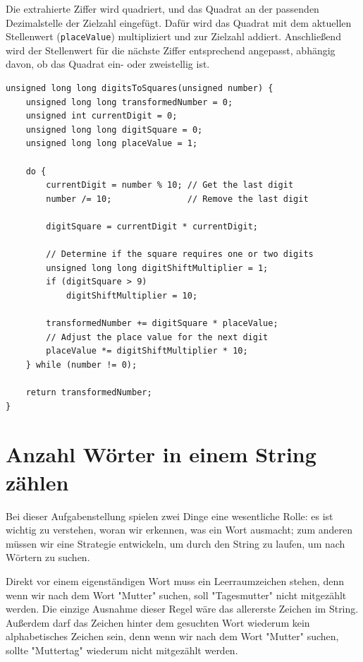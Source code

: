 Die extrahierte Ziffer wird quadriert, und das Quadrat an der passenden
Dezimalstelle der Zielzahl eingefügt. Dafür wird das Quadrat mit dem aktuellen
Stellenwert (\texttt{placeValue}) multipliziert und zur Zielzahl addiert.
Anschließend wird der Stellenwert für die nächste Ziffer entsprechend angepasst,
abhängig davon, ob das Quadrat ein- oder zweistellig ist.

\begin{verbatim}
unsigned long long digitsToSquares(unsigned number) {
    unsigned long long transformedNumber = 0;
    unsigned int currentDigit = 0;
    unsigned long long digitSquare = 0;
    unsigned long long placeValue = 1;

    do {
        currentDigit = number % 10; // Get the last digit
        number /= 10;               // Remove the last digit

        digitSquare = currentDigit * currentDigit;

        // Determine if the square requires one or two digits
        unsigned long long digitShiftMultiplier = 1;
        if (digitSquare > 9)
            digitShiftMultiplier = 10;

        transformedNumber += digitSquare * placeValue;
        // Adjust the place value for the next digit
        placeValue *= digitShiftMultiplier * 10;
    } while (number != 0);

    return transformedNumber;
}
\end{verbatim}




\chapter{Anzahl Wörter in einem String zählen}

Bei dieser Aufgabenstellung spielen zwei Dinge eine wesentliche Rolle: es ist
wichtig zu verstehen, woran wir erkennen, was ein Wort ausmacht; zum anderen
müssen wir eine Strategie entwickeln, um durch den String zu laufen, um nach
Wörtern zu suchen.

Direkt vor einem eigenständigen Wort muss ein Leerraumzeichen stehen, denn wenn
wir nach dem Wort "Mutter" suchen, soll "Tagesmutter" nicht mitgezählt werden.
Die einzige Ausnahme dieser Regel wäre das allererste Zeichen im String.
Außerdem darf das Zeichen hinter dem gesuchten Wort wiederum kein alphabetisches
Zeichen sein, denn wenn wir nach dem Wort "Mutter" suchen, sollte "Muttertag"
wiederum nicht mitgezählt werden.


